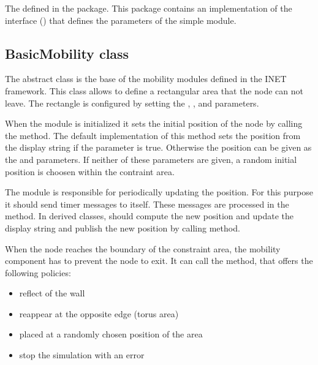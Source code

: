 The  defined in the  package.
This package contains an implementation of the interface
() that defines the parameters of the
 simple module.


\subsection{BasicMobility class}

The abstract  class is the base of the mobility
modules defined in the INET framework. This class allows to define
a rectangular area that the node can not leave. The rectangle is configured
by setting the , ,
 and  parameters.

When the module is initialized it sets the initial position of the node
by calling the  method.
The default implementation of this method sets the position from the
display string if the  parameter is true.
Otherwise the position can be given as the  and
 parameters. If neither of these parameters are given,
a random initial position is choosen within the contraint area.

The module is responsible for periodically updating the position.
For this purpose it should send timer messages to itself. These messages
are processed in the  method. In derived
classes,  should compute the new position
and update the display string and publish the new position by calling
 method.

When the node reaches the boundary of the constraint area, the mobility
component has to prevent the node to exit. It can call the
 method, that offers the following policies:

\begin{itemize}
  \item reflect of the wall
  \item reappear at the opposite edge (torus area)
  \item placed at a randomly chosen position of the area
  \item stop the simulation with an error
\end{itemize}

